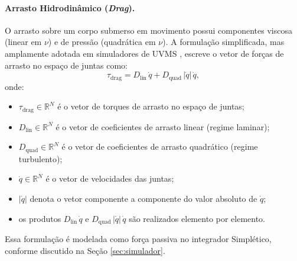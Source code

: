 \paragraph{Arrasto Hidrodinâmico (\textit{Drag}).}
O arrasto sobre um corpo submerso em movimento possui componentes viscosa (linear em $\nu$) e de pressão (quadrática em $\nu$). A formulação simplificada, mas amplamente adotada em simuladores de UVMS \cite{antonelli2014modelling, fossen2011handbook}, escreve o vetor de forças de arrasto no espaço de juntas como:
\begin{equation}
    \tau_{\text{drag}} = D_{\text{lin}}\,\dot{q} + D_{\text{quad}}\,|\dot{q}|\,\dot{q},
    \label{eq:drag}
\end{equation}
onde:
\begin{itemize}
    \item $\tau_{\text{drag}} \in \mathbb{R}^{N}$ é o vetor de torques de arrasto no espaço de juntas;
    \item $D_{\text{lin}} \in \mathbb{R}^{N}$ é o vetor de coeficientes de arrasto linear (regime laminar);
    \item $D_{\text{quad}} \in \mathbb{R}^{N}$ é o vetor de coeficientes de arrasto quadrático (regime turbulento);
    \item $\dot{q} \in \mathbb{R}^{N}$ é o vetor de velocidades das juntas;
    \item $|\dot{q}|$ denota o vetor componente a componente do valor absoluto de $\dot{q}$;
    \item os produtos $D_{\text{lin}}\,\dot{q}$ e $D_{\text{quad}}\,|\dot{q}|\,\dot{q}$ são realizados elemento por elemento.
\end{itemize}
Essa formulação é modelada como força passiva no integrador Simplético, conforme discutido na Seção \ref{sec:simulador}.

